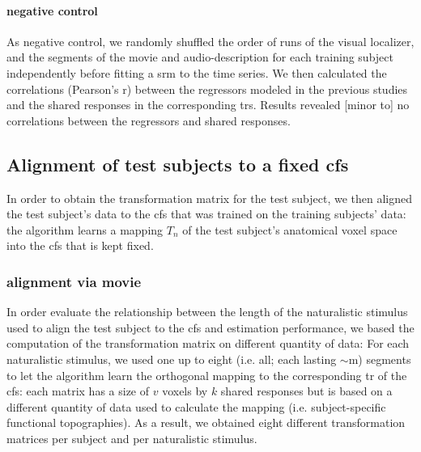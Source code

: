 \paragraph{negative control}


As negative control, we randomly shuffled the order of runs of the visual
localizer, and the segments of the movie and audio-description for each training
subject independently before fitting a \ac{srm} to the time series.
We then calculated the correlations (Pearson's r) between the regressors modeled
in the previous studies and the shared responses in the corresponding \acp{tr}.
Results revealed [minor to] no correlations between the regressors and shared
responses.


\subsection{Alignment of test subjects to a fixed \ac{cfs}}



%
In order to obtain the transformation matrix for the test subject, we then
aligned the test subject's data to the \ac{cfs} that was trained on the training
subjects' data:
%
the algorithm learns a mapping $T_{n}$ of the test subject's anatomical voxel
space into the \ac{cfs} that is kept fixed.


\subsubsection{alignment via movie}
%
In order evaluate the relationship between the length of the naturalistic
stimulus used to align the test subject to the \ac{cfs} and estimation
performance, we based the computation of the transformation matrix on different
quantity of data:
%
For each naturalistic stimulus, we used one up to eight (i.e. all; each lasting
$\sim$\unit[15]{m}) segments to let the algorithm learn the orthogonal mapping
to the corresponding \acs{tr} of the \ac{cfs}:
%
each matrix has a size of $v$ voxels by $k$ shared responses but is based on a
different quantity of data used to calculate the mapping (i.e. subject-specific
functional topographies).
%
As a result, we obtained eight different transformation matrices per subject and
per naturalistic stimulus.



